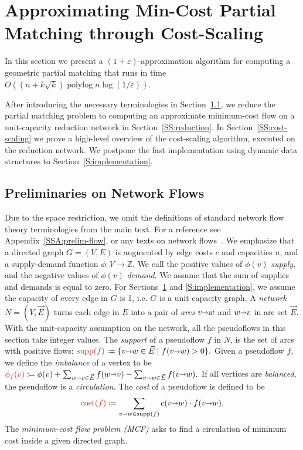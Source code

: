 \documentclass[a4paper,UKenglish]{socg-lipics-v2018}
\def\polylog{\mathop{\mathrm{polylog}}}
\def\eps{\varepsilon}
\def\ints{\mathbb{Z}}
\def\set#1{\{ #1 \}}
\def\fsupply{\phi}
\def\arcto{\mathord\shortrightarrow}
\def\arc#1#2{#1\arcto#2}
\def\cost{\operatorname{cost}}
\def\supp{\operatorname{supp}}
\theoremstyle{plain}
\numberwithin{figure}{section}
\def\EMPH#1{\textcolor{BrickRed}{{\emph{#1}}}}
\begin{document}
\section{Approximating Min-Cost Partial Matching through Cost-Scaling}
\label{section:goldberg}

In this section we present a $(1+\eps)$-approximation algorithm for computing a
geometric partial matching that runs in time $O((n + k\sqrt{k})\polylog n \log(1/\eps))$.

After introducing the necessary terminologies in Section~\ref{SS:prelim-flow}, we reduce the partial matching problem to computing an approximate minimum-cost flow on a unit-capacity reduction network in Section~\ref{SS:reduction}.
In Section~\ref{SS:cost-scaling} we prove a high-level overview of the cost-scaling algorithm, executed on the reduction network.
We postpone the fast implementation using dynamic data structures to Section~\ref{S:implementation}.

\subsection{Preliminaries on Network Flows}
\label{SS:prelim-flow}

Due to the space restriction, we omit the definitions of standard network flow theory terminologies from the main text.  For a reference see Appendix~\ref{SSA:prelim-flow}, or any texts on network flows~\cite{O93,GHKT17}.
%
We emphasize that a directed graph $G=(V,E)$ is augmented by edge costs $c$ and
capacities $u$, and a supply-demand function $\fsupply:V \to \ints$.
We call the positive values of $\fsupply(v)$ \EMPH{supply}, and the negative values of $\fsupply(v)$ \EMPH{demand}.
We assume that the sum of supplies and demands is equal to zero.
For Sections~\ref{section:goldberg} and \ref{S:implementation}, we assume the capacity of every edge in $G$ is 1, i.e. $G$ is a unit capacity graph.
A \EMPH{network $N = (V, \vec{E})$} turns each edge in $E$ into a pair of
\EMPH{arcs} $\arc vw$ and $\arc wv$ in arc set $\vec{E}$.
With the unit-capacity assumption on the network, all the pseudoflows in this section take integer values.
The \EMPH{support} of a pseudoflow $f$ in $N$, is the set of arcs with positive flows:
\(
\EMPH{$\supp(f)$} \coloneqq \set{\arc vw \in \vec{E} \mid f(\arc vw) > 0}.
\)
Given a pseudoflow $f$, we define the \EMPH{imbalance} of a vertex to be
\(
\EMPH{$\fsupply_f (v)$} \coloneqq \fsupply(v) + \sum_{\arc wv \in \vec{E}}{f(\arc wv)} - \sum_{\arc vw \in \vec{E}}{f(\arc vw)}.
\)
If all vertices are \emph{balanced}, the pseudoflow is a \EMPH{circulation}.
The \EMPH{cost} of a pseudoflow
is defined to be
\[
 \EMPH{$\cost(f)$} \coloneqq \sum_{\arc vw \in \supp(f)} c(\arc vw) \cdot f(\arc vw).
\]
%
The \EMPH{minimum-cost flow problem (MCF)} asks to find a circulation of minimum cost inside a given directed graph.
\end{document}
